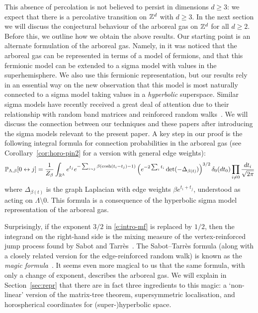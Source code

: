 \documentclass[11pt]{amsart}
\numberwithin{equation}{section}
\numberwithin{theorem}{section}
\begin{document}
This absence of percolation is not believed
to persist in dimensions $d\geq 3$: we expect that there is a
percolative transition on $\mathbb{Z}^{d}$ with $d\geq 3$.
In the next section we will discuss the conjectural behaviour of the arboreal
gas on $\mathbb{Z}^{d}$ for all $d\geq 2$. Before this, we outline how we
obtain the above results.  Our starting point is an alternate
formulation of the arboreal gas. Namely, in
\cite{MR3622573,MR2437672,MR2110547} it was noticed that the arboreal
gas can be represented in terms of a model of fermions, and that this
fermionic model can be extended to a sigma model with values in the
superhemisphere. We also use this fermionic representation, but our
results rely in an essential way on the new observation that this model is
most naturally connected to a sigma model taking values in a
\emph{hyperbolic} superspace. Similar sigma models have recently
received a great deal of attention due to their relationship with
random band matrices and reinforced random
walks~\cite{MR2728731,MR4021254,MR3420510,1907.07949}. We will
discuss the connection between our techniques and these papers after
introducing the sigma models relevant to the present paper. 
A key step in our proof is the following integral formula
for connection probabilities
in the arboreal gas (see Corollary~\ref{cor:horo-pin2}
for a version with general edge weights):
\begin{equation} \label{e:intro-mf}
  \mathbb{P}_{\Lambda,\beta}[0\leftrightarrow j]
  = \frac{1}{Z_\beta} \int_{\mathbb{R}^{\Lambda}} e^{t_j} e^{-\sum_{i\sim j} \beta (\cosh(t_i-t_j)-1)} \left({ e^{-2\sum_{i}t_i} \det(-\Delta_{\beta(t)})}\right)^{3/2}
  \delta_0(dt_0) \prod_{i\neq 0} \frac{dt_i}{\sqrt{2\pi}}
\end{equation}
where $\Delta_{\beta(t)}$ is the graph Laplacian with edge weights
$\beta e^{t_i+t_j}$, understood as acting on $\Lambda\setminus
0$. This formula is a consequence of the hyperbolic sigma model
representation of the arboreal gas.

Surprisingly, if the exponent $3/2$ in \eqref{e:intro-mf} is replaced
by $1/2$, then the integrand on the right-hand side is the mixing
measure of the vertex-reinforced jump process found by Sabot and
Tarr\`es~\cite{MR3420510}.  The Sabot--Tarr\`es formula (along with a
closely related version for the edge-reinforced random walk) is known
as the \emph{magic formula}~\cite{MR3469136}. It seems even more magical
to us that the same formula, with only a change of exponent, describes
the arboreal gas. We will explain in Section~\ref{sec:repr} that there are
in fact three ingredients to this magic: a `non-linear' version of the
matrix-tree theorem, supersymmetric localisation, and horospherical
coordinates for (super-)hyperbolic space.
\end{document}
